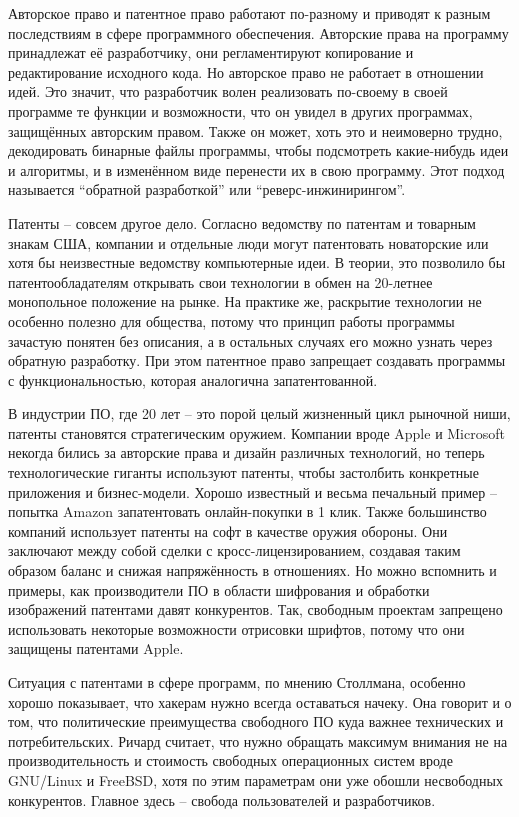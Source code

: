 Авторское право и патентное право работают по-разному и приводят к разным последствиям в сфере программного обеспечения. Авторские права на программу принадлежат её разработчику, они регламентируют копирование и редактирование исходного кода. Но авторское право не работает в отношении идей. Это значит, что разработчик волен реализовать по-своему в своей программе те функции и возможности, что он увидел в других программах, защищённых авторским правом. Также он может, хоть это и неимоверно трудно, декодировать бинарные файлы программы, чтобы подсмотреть какие-нибудь идеи и алгоритмы, и в изменённом виде перенести их в свою программу. Этот подход называется \enquote{обратной разработкой} или \enquote{реверс-инжинирингом}.

Патенты -- совсем другое дело. Согласно ведомству по патентам и товарным знакам США, компании и отдельные люди могут патентовать новаторские или хотя бы неизвестные ведомству компьютерные идеи. В теории, это позволило бы патентообладателям открывать свои технологии в обмен на 20-летнее монопольное положение на рынке. На практике же, раскрытие технологии не особенно полезно для общества, потому что принцип работы программы зачастую понятен без описания, а в остальных случаях его можно узнать через обратную разработку. При этом патентное право запрещает создавать программы с функциональностью, которая аналогична запатентованной.

В индустрии ПО, где 20 лет -- это порой целый жизненный цикл рыночной ниши, патенты становятся стратегическим оружием. Компании вроде Apple и Microsoft некогда бились за авторские права и дизайн различных технологий, но теперь технологические гиганты используют патенты, чтобы застолбить конкретные приложения и бизнес-модели. Хорошо известный и весьма печальный пример -- попытка Amazon запатентовать онлайн-покупки в 1 клик. Также большинство компаний использует патенты на софт в качестве оружия обороны. Они заключают между собой сделки с кросс-лицензированием, создавая таким образом баланс и снижая напряжённость в отношениях. Но можно вспомнить и примеры, как производители ПО в области шифрования и обработки изображений патентами давят конкурентов. Так, свободным проектам запрещено использовать некоторые возможности отрисовки шрифтов, потому что они защищены патентами Apple.

Ситуация с патентами в сфере программ, по мнению Столлмана, особенно хорошо показывает, что хакерам нужно всегда оставаться начеку. Она говорит и о том, что политические преимущества свободного ПО куда важнее технических и потребительских. Ричард считает, что нужно обращать максимум внимания не на производительность и стоимость свободных операционных систем вроде GNU/Linux и FreeBSD, хотя по этим параметрам они уже обошли несвободных конкурентов. Главное здесь -- свобода пользователей и разработчиков.

